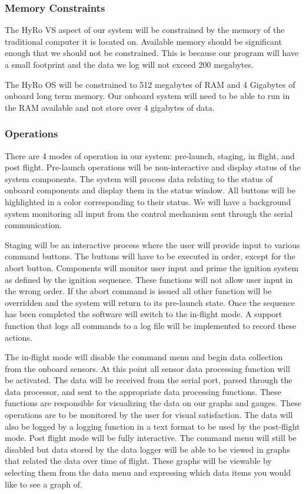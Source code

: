 \documentclass[10pt,draftclsnofoot,onecolumn,compsoc]{IEEEtran}
\begin{document}
\subsubsection{Memory Constraints}
The HyRo VS aspect of our system will be constrained by the memory of the traditional computer it is located on. Available memory should be significant enough that we should not be constrained. This is because our program will have a small footprint and the data we log will not exceed 200 megabytes.\par 
	The HyRo OS will be constrained to 512 megabytes of RAM and 4 Gigabytes of onboard long term memory. Our onboard system will need to be able to run in the RAM available and not store over 4 gigabytes of data.


\subsubsection {Operations}
There are 4 modes of operation in our system: pre-launch, staging, in flight, and post flight.  Pre-launch operations will be non-interactive and display status of the system components. The system will process data relating to the status of onboard components and display them in the status window. All buttons will be highlighted in a color corresponding to their status. We will have a background system monitoring all input from the control mechanism sent through the serial communication. \par
	Staging will be an interactive process where the user will provide input to various command buttons. The buttons will have to be executed in order, except for the abort button. Components will monitor user input and prime the ignition system as defined by the ignition sequence. These functions will not allow user input in the wrong order. If the abort command is issued all other function will be overridden and the system will return to its pre-launch state. Once the sequence has been completed the software will switch to the in-flight mode. A support function that logs all commands to a log file will be implemented to record these actions.\par
	The in-flight mode will disable the command menu and begin data collection from the onboard sensors. At this point all sensor data processing function will be activated. The data will be received from the serial port, parsed through the data processor, and sent to the appropriate data processing functions. These functions are responsible for visualizing the data on our graphs and gauges. These operations are to be monitored by the user for visual satisfaction.  The data will also be logged by a logging function in a text format to be used by the post-flight mode.
	Post flight mode will be fully interactive. The command menu will still be disabled but data stored by the data logger will be able to be viewed in graphs that related the data over time of flight. These graphs will be viewable by selecting them from the data menu and expressing which data items you would like to see a graph of. \par
\end{document}
